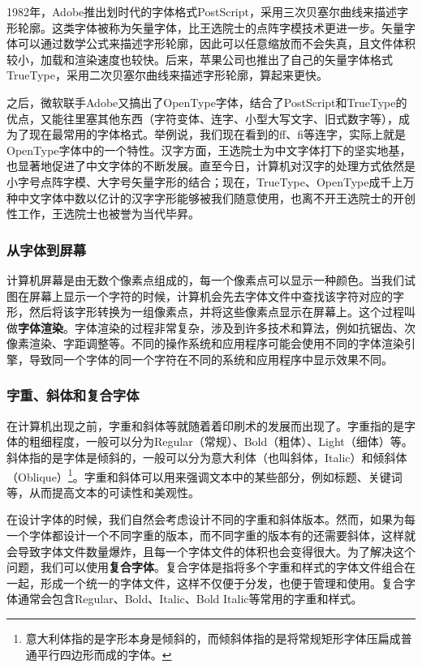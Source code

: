 1982年，Adobe推出划时代的字体格式PostScript，采用三次贝塞尔曲线来描述字形轮廓。这类字体被称为矢量字体，比王选院士的点阵字模技术更进一步。矢量字体可以通过数学公式来描述字形轮廓，因此可以任意缩放而不会失真，且文件体积较小，加载和渲染速度也较快。后来，苹果公司也推出了自己的矢量字体格式TrueType，采用二次贝塞尔曲线来描述字形轮廓，算起来更快。

之后，微软联手Adobe又搞出了OpenType字体，结合了PostScript和TrueType的优点，又能往里塞其他东西（字符变体、连字、小型大写文字、旧式数字等），成为了现在最常用的字体格式。举例说，我们现在看到的ff、fi等连字，实际上就是OpenType字体中的一个特性。汉字方面，王选院士为中文字体打下的坚实地基，也显著地促进了中文字体的不断发展。直至今日，计算机对汉字的处理方式依然是小字号点阵字模、大字号矢量字形的结合；现在，TrueType、OpenType成千上万种中文字体中数以亿计的汉字字形能够被我们随意使用，也离不开王选院士的开创性工作，王选院士也被誉为当代毕昇。

\subsubsection{从字体到屏幕}

计算机屏幕是由无数个像素点组成的，每一个像素点可以显示一种颜色。当我们试图在屏幕上显示一个字符的时候，计算机会先去字体文件中查找该字符对应的字形，然后将该字形转换为一组像素点，并将这些像素点显示在屏幕上。这个过程叫做\textbf{字体渲染}。字体渲染的过程非常复杂，涉及到许多技术和算法，例如抗锯齿、次像素渲染、字距调整等。不同的操作系统和应用程序可能会使用不同的字体渲染引擎，导致同一个字体的同一个字符在不同的系统和应用程序中显示效果不同。

\subsubsection{字重、斜体和复合字体}

在计算机出现之前，字重和斜体等就随着着印刷术的发展而出现了。字重指的是字体的粗细程度，一般可以分为Regular（常规）、Bold（粗体）、Light（细体）等。斜体指的是字体是倾斜的，一般可以分为意大利体（也叫斜体，Italic）和倾斜体（Oblique）\footnote{意大利体指的是字形本身是倾斜的，而倾斜体指的是将常规矩形字体压扁成普通平行四边形而成的字体。}。字重和斜体可以用来强调文本中的某些部分，例如标题、关键词等，从而提高文本的可读性和美观性。

在设计字体的时候，我们自然会考虑设计不同的字重和斜体版本。然而，如果为每一个字体都设计一个不同字重的版本，而不同字重的版本有的还需要斜体，这样就会导致字体文件数量爆炸，且每一个字体文件的体积也会变得很大。为了解决这个问题，我们可以使用\textbf{复合字体}。复合字体是指将多个字重和样式的字体文件组合在一起，形成一个统一的字体文件，这样不仅便于分发，也便于管理和使用。复合字体通常会包含Regular、Bold、Italic、Bold Italic等常用的字重和样式。

